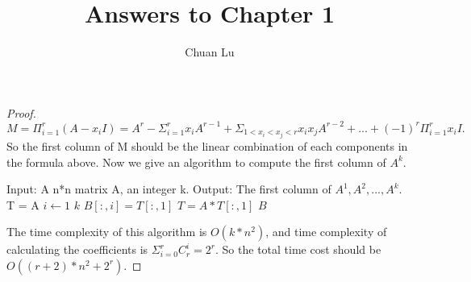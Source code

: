 \documentclass[12pt]{article}
\newenvironment{problem}[2][Problem]{\begin{trivlist}
\item[\hskip \labelsep {\bfseries #1}\hskip \labelsep {\bfseries #2.}]}{\end{trivlist}}
\begin{document}
 
\title{Answers to Chapter 1}
\author{Chuan Lu}
\maketitle
 
\begin{problem}{Page 13, P1.1.1}
\end{problem}
 
\begin{proof}
$M = \Pi_{i=1}^{r}(A-x_{i}I)=A^r-\Sigma_{i=1}^{r}x_{i}A^{r-1}+\Sigma_{1<x_i<x_j<r}x_ix_jA^{r-2}+...+(-1)^r\Pi_{i=1}^{r}x_iI.$\\
So the first column of M should be the linear combination of each components in the formula above. Now we give an algorithm to compute the first column of $A^k$.
\begin{codebox}
\zi Input: A n*n matrix A, an integer k.
\zi Output: The first column of $A^1, A^2, ..., A^k$.
\li T = A
\li \For $i \gets 1$ \To $k$
\li 	\Do
			$B[:, i] = T[:, 1]$
\li			$T = A*T[:, 1]$
		\End
\li \Return $B$
\end{codebox}
The time complexity of this algorithm is $O(k*n^2)$, and time complexity of calculating the coefficients is $\Sigma_{i=0}^{r}C_{r}^{i} = 2^r$. So the total time cost should be $O((r+2)*n^2+2^r)$.
\end{proof}
\end{document}
